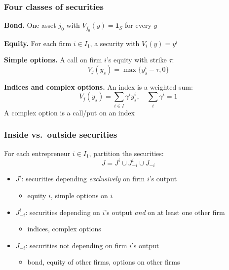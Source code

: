 \documentclass[blue]{beamer}
\def\1{\mathbf{1}}
\theoremstyle{definition}
\theoremstyle{example}
\begin{document}
\begin{frame}\frametitle{Four classes of securities}
\textbf{Bond.} One asset $j_0$ with $V_{j_0}(y) = \1_S$ for every $y$
\bigskip

\textbf{Equity.} For each firm $i \in I_1$, a security with $V_i(y) = y^i$
\bigskip

\textbf{Simple options.} A call on firm $i$'s equity with strike $\tau$:
\begin{equation*}
V_j(y_s) = \max\{ y^i_s - \tau, 0 \}
\end{equation*}


\textbf{Indices and complex options.} An index is a weighted sum:
\begin{equation*}
V_j(y_s) = \sum_{i \in I} \gamma^i y^i_s, \quad \sum_i \gamma^i = 1
\end{equation*}
A complex option is a call/put on an index
\end{frame}

\begin{frame}\frametitle{Inside vs.\ outside securities}
For each entrepreneur $i \in I_1$, partition the securities:
\begin{equation*}
J = J^i \cup J^i_{-i} \cup J_{-i}
\end{equation*}

\begin{itemize}
\item $J^i$: securities depending \emph{exclusively} on firm $i$'s output
    \begin{itemize}
    \item equity $i$, simple options on $i$
    \end{itemize}
\item $J^i_{-i}$: securities depending on $i$'s output \emph{and} on at least one other firm
    \begin{itemize}
    \item indices, complex options
    \end{itemize}
\item $J_{-i}$: securities not depending on firm $i$'s output
    \begin{itemize}
    \item bond, equity of other firms, options on other firms
    \end{itemize}
\end{itemize}
\end{frame}
\end{document}
